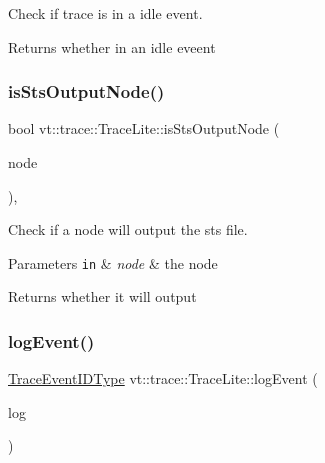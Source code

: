 Check if trace is in a idle event. 

\begin{DoxyReturn}{Returns}
whether in an idle eveent 
\end{DoxyReturn}
\mbox{\label{structvt_1_1trace_1_1_trace_lite_acfad34ebd68c53547dcff4115dd54388}} 
\subsubsection{\texorpdfstring{is\+Sts\+Output\+Node()}{isStsOutputNode()}}
{\footnotesize\ttfamily bool vt\+::trace\+::\+Trace\+Lite\+::is\+Sts\+Output\+Node (\begin{DoxyParamCaption}\item[{\hyperlink{namespacevt_a866da9d0efc19c0a1ce79e9e492f47e2}{Node\+Type}}]{node }\end{DoxyParamCaption})\hspace{0.3cm}{\ttfamily [static]}, {\ttfamily [protected]}}



Check if a node will output the sts file. 


\begin{DoxyParams}[1]{Parameters}
\mbox{\tt in}  & {\em node} & the node\\
\hline
\end{DoxyParams}
\begin{DoxyReturn}{Returns}
whether it will output 
\end{DoxyReturn}
\mbox{\label{structvt_1_1trace_1_1_trace_lite_aeb468f1222761674e4ffb0cfa27f0641}} 
\subsubsection{\texorpdfstring{log\+Event()}{logEvent()}}
{\footnotesize\ttfamily \hyperlink{namespacevt_1_1trace_a64a7185f3e102df8d8258f263ccd1582}{Trace\+Event\+I\+D\+Type} vt\+::trace\+::\+Trace\+Lite\+::log\+Event (\begin{DoxyParamCaption}\item[{\hyperlink{structvt_1_1trace_1_1_trace_lite_aeb73e523d31829d3163c877b145afa2a}{Log\+Type} \&\&}]{log }\end{DoxyParamCaption})\hspace{0.3cm}{\ttfamily [protected]}}



